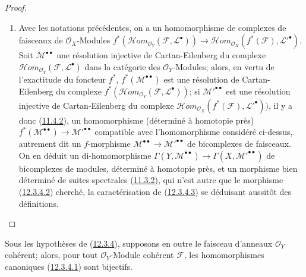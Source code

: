 \begin{proof}
\begin{enumerate}
\item[{\rm(ii)}]
Avec les notations précédentes, on a un homomorphisme de complexes de
faisceaux de $\mathcal O_X$-Modules
$f^*(\mathcal{H}om_{\mathcal O_Y}(\mathcal F,\mathcal L^\bullet))\longrightarrow\mathcal{H}om_{\mathcal O_X}(f^*(\mathcal F),\mathcal L'^\bullet)$.
Soit $\mathcal M^{\bullet\bullet}$ une résolution injective de
Cartan-Eilenberg du complexe
$\mathcal{H}om_{\mathcal O_Y}(\mathcal F,\mathcal L^\bullet)$ dans la
catégorie des $\mathcal O_Y$-Modules; alors, en vertu de l'exactitude du
foncteur $f^*$, $f^*(\mathcal M^{\bullet\bullet})$ est une résolution de
Cartan-Eilenberg du complexe
$f^*(\mathcal{H}om_{\mathcal O_Y}(\mathcal F,\mathcal L^\bullet))$; si
$\mathcal M'^{\bullet\bullet}$ est une résolution injective de
Cartan-Eilenberg du complexe
$\mathcal{H}om_{\mathcal O_X}(f^*(\mathcal F),\mathcal L'^\bullet))$, il y a
donc (\hyperref[0.11.4.2-fr]{11.4.2}), un homomorphisme (déterminé à
homotopie près)
$f^*(\mathcal M^{\bullet\bullet})\longrightarrow\mathcal M'^{\bullet\bullet}$
compatible avec l'homomorphisme considéré ci-dessus, autrement dit un
$f$-morphisme $\mathcal M^{\bullet\bullet}\to
\mathcal M'^{\bullet\bullet}$ de bicomplexes de faisceaux. On en déduit un
di-homomorphisme
$\Gamma(Y,\mathcal M^{\bullet\bullet})\to
\Gamma(X,\mathcal M'^{\bullet\bullet})$ de bicomplexes de modules, déterminé
à homotopie près, et un morphisme bien déterminé de suites spectrales
(\hyperref[0.11.3.2-fr]{11.3.2}), qui n'est autre que le morphisme
(\hyperref[0.12.3.4.2-fr]{12.3.4.2}) cherché, la caractérisation de
(\hyperref[0.12.3.4.3-fr]{12.3.4.3}) se déduisant aussitôt des définitions.
\end{enumerate}
\end{proof}

\begin{proposition}[12.3.5]
\label{0.12.3.5-fr}
Sous les hypothèses de (\hyperref[0.12.3.4-fr]{12.3.4}), supposons en
outre le faisceau d'anneaux $\mathcal O_Y$ cohérent; alors, pour tout
$\mathcal O_Y$-Module cohérent $\mathcal F$, les homomorphismes canoniques
(\hyperref[0.12.3.4.1-fr]{12.3.4.1}) sont bijectifs.
\end{proposition}

